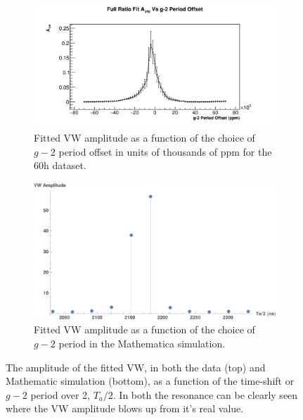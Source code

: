 \documentclass[12pt,letterpaper]{article}
\def\gmtwo{$g-2$\xspace}
\begin{document}
\begin{figure}[]
\centering
    \begin{subfigure}[t]{0.8\textwidth}
        \centering
        \includegraphics[width=\textwidth]{AvwResonance_60h}
        \caption{Fitted VW amplitude as a function of the choice of \gmtwo period offset in units of thousands of ppm for the 60h dataset.}
    \end{subfigure}%
    \vspace{1cm}
    \begin{subfigure}[t]{0.6\textwidth}
        \centering
        \includegraphics[width=\textwidth]{AvwResonance_Mathematica}
        \caption{Fitted VW amplitude as a function of the choice of \gmtwo period in the Mathematica simulation.}
    \end{subfigure}
\caption[]{The amplitude of the fitted VW, in both the data (top) and Mathematic simulation (bottom), as a function of the time-shift or \gmtwo period over 2, $T_{a}/2$. In both the resonance can be clearly seen where the VW amplitude blows up from it's real value.}
\label{fig:resonance}
\end{figure}

\clearpage
\end{document}
